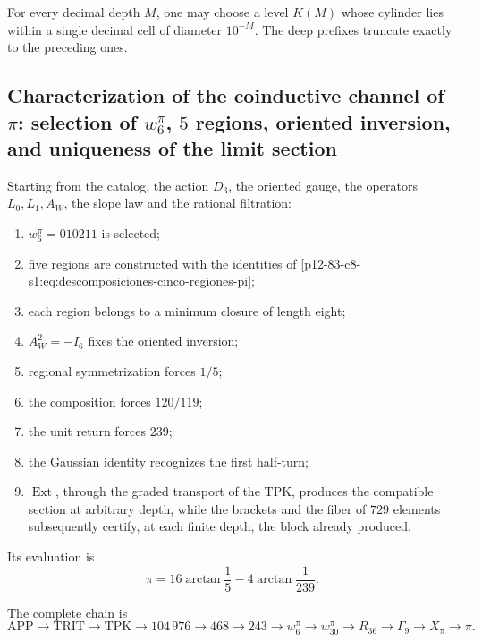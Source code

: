 For every decimal depth \(M\), one may choose a level \(K(M)\) whose
cylinder lies within a single decimal cell of diameter \(10^{-M}\).
The deep prefixes truncate exactly to the preceding ones.

\subsection{Characterization of the coinductive channel of \(\pi\): selection of \(w_6^\pi\), \(5\) regions, oriented inversion, and uniqueness of the limit section}

\begin{theorem}
\label{p12-83-c8-s1:thm:caracterizacion-final-pi-autonoma}
Starting from the catalog, the action \(D_3\), the oriented gauge, the
operators \(L_0,L_1,A_W\), the slope law and the rational filtration:
\begin{enumerate}
 \item \(w_6^\pi=010211\) is selected;
 \item five regions are constructed with the identities of
       \eqref{p12-83-c8-s1:eq:descomposiciones-cinco-regiones-pi};
 \item each region belongs to a minimum closure of length eight;
 \item \(A_W^2=-I_6\) fixes the oriented inversion;
 \item regional symmetrization forces \(1/5\);
 \item the composition forces \(120/119\);
 \item the unit return forces \(239\);
 \item the Gaussian identity recognizes the first half-turn;
 \item \(\operatorname{Ext}\), through the graded transport of the TPK,
       produces the compatible section at arbitrary depth, while the
       brackets and the fiber of \(729\) elements subsequently certify, at each
       finite depth, the block already produced.
\end{enumerate}
Its evaluation is
\[
 \boxed{\pi=16\arctan\frac15-4\arctan\frac1{239}.}
\]
\end{theorem}

The complete chain is
\[
 \mathrm{APP}\to\mathrm{TRIT}\to\mathrm{TPK}
 \to104\,976\to468\to243\to w_6^\pi
 \to w_{30}^\pi\to R_{36}\to\Gamma_9
 \to X_\pi\to\pi.
\]

